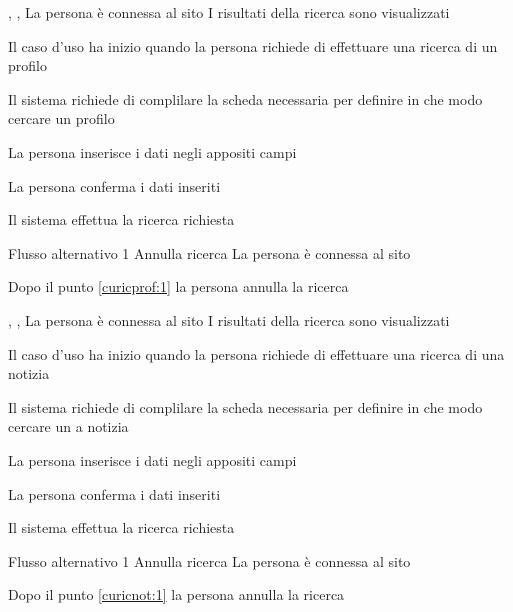 \tabcuvspace

{, , }
{La persona è connessa al sito}
{I risultati della ricerca sono visualizzati}
{\begin{enumCU}
	\item Il caso d'uso ha inizio quando la persona richiede di effettuare una ricerca di un profilo
	\item Il sistema richiede di complilare la scheda necessaria per definire in che modo cercare un profilo
	\item La persona inserisce i dati negli appositi campi \label{curicprof:1}
	\item La persona conferma i dati inseriti
	\item Il sistema effettua la ricerca richiesta
\end{enumCU}}
%
{Flusso alternativo 1}%
{Annulla ricerca}%
{La persona è connessa al sito}%
{\postNulle}%
{\begin{enumCU}
		\item Dopo il punto \ref{curicprof:1} la persona annulla la ricerca
	\end{enumCU}}%

\tabcuvspace

{, , }
{La persona è connessa al sito}
{I risultati della ricerca sono visualizzati}
{\begin{enumCU}
	\item Il caso d'uso ha inizio quando la persona richiede di effettuare una ricerca di una notizia
	\item Il sistema richiede di complilare la scheda necessaria per definire in che modo cercare un a notizia
	\item La persona inserisce i dati negli appositi campi \label{curicnot:1}
	\item La persona conferma i dati inseriti
	\item Il sistema effettua la ricerca richiesta
\end{enumCU}}
%
{Flusso alternativo 1}%
{Annulla ricerca}%
{La persona è connessa al sito}%
{\postNulle}%
{\begin{enumCU}
		\item Dopo il punto \ref{curicnot:1} la persona annulla la ricerca
	\end{enumCU}}%

